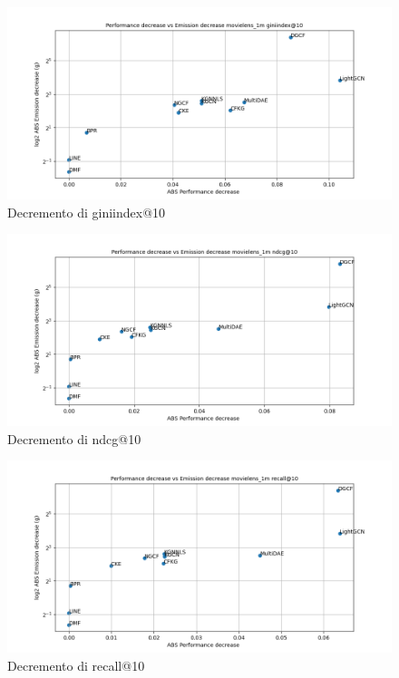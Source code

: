 \begin{figure}[H]
    \centering
     \includegraphics[width=\textwidth]{images/decrement_giniindex@10_movielens_1m.png}
    \caption{Decremento di giniindex@10}
\end{figure}

\begin{figure}[H]
    \centering
     \includegraphics[width=\textwidth]{images/decrement_ndcg@10_movielens_1m.png}
    \caption{Decremento di ndcg@10}
\end{figure}

\begin{figure}[H]
    \centering
     \includegraphics[width=\textwidth]{images/decrement_recall@10_movielens_1m.png}
    \caption{Decremento di recall@10}
\end{figure}


